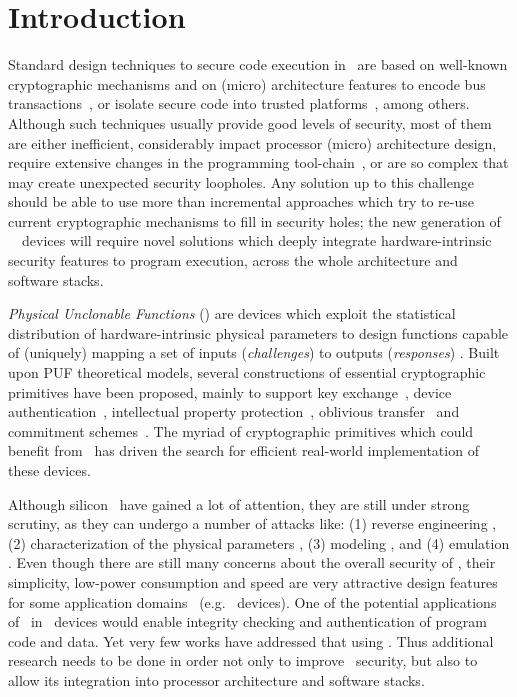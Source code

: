 \chapter{Introduction}
\label{chap:introduction}

Standard design techniques to secure code execution in \socs~are based on well-known cryptographic mechanisms and on (micro) architecture features to encode bus transactions~\cite{Elbaz2005}, or isolate secure code into trusted platforms~\cite{tpm_spec}, among others. Although such techniques usually provide good levels of security, most of them are either inefficient, considerably impact processor (micro) architecture design, require extensive changes in the programming tool-chain~\cite{Suh2003a}, or are so complex \cite{Suh2005} that may create unexpected security loopholes. Any solution up to this challenge should be able to use more than incremental approaches which try to re-use current cryptographic mechanisms to fill in security holes; the new generation of \iot~\soc~devices will require novel solutions which deeply integrate hardware-intrinsic security features to program execution, across the whole architecture and software stacks.

\textit{Physical Unclonable Functions} (\pufs) are devices which exploit the statistical distribution of hardware-intrinsic physical parameters to design functions capable of (uniquely) mapping a set of inputs (\textit{challenges}) to outputs (\textit{responses}) \cite{PRTG02}. Built upon PUF theoretical models, several constructions of essential cryptographic primitives have been proposed, mainly to support key exchange~\cite{LLG05,STO05,BFSK11}, device authentication~\cite{Suh2007}, intellectual property protection~\cite{GKST07}, oblivious transfer~\cite{R10,BFSK11} and commitment schemes~\cite{BFSK11}. The myriad of cryptographic primitives which could benefit from \pufs~has driven the search for efficient real-world implementation of these devices.

Although silicon \pufs~have gained a lot of attention, they are still under strong scrutiny, as they can undergo a number of attacks like: (1) reverse engineering \cite{Nedospasov2013}, (2) characterization of the physical parameters \cite{Tajik2014}, (3) modeling \cite{Becker2015}, and (4) emulation \cite{Helfmeier2013}. Even though there are still many concerns about the overall security of \pufs, their simplicity, low-power consumption and speed are very attractive design features for some application domains~\cite{1502786} (e.g. \iot~devices). One of the potential applications of \pufs~in \iot~devices would enable integrity checking and authentication of program code and data. Yet very few works have addressed that using \pufs\cite{Suh2005}. Thus additional research needs to be done in order not only to improve \puf~security, but also to allow its integration into processor architecture and software stacks.


